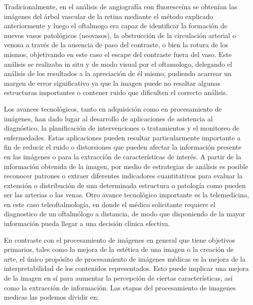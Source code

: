 Tradicionalmente, en el análisis de  angiografía con fluoresceína  se obtenían las imágenes del árbol vascular de la retina mediante  el método explicado anteriormente y luego  el oftalmogo era capaz de identificar la formación de nuevos vasos patológicos (neovasos), la obstrucción de la circulación arterial o venosa a través de la ausencia de paso del contraste, o bien la rotura de los mismos, objetivando en este caso el escape del contraste fuera del vaso. Este análisis se realizaba in situ y de modo visual por el oftamologo, delegando el análisis de los resultados a la apreciación de él mismo, pudiendo acarrear un margen de error significativo ya que la imagen puede no resaltar algunas estructuras importantes o contener ruido que dificulten el correcto análisis.

Los avances tecnológicos, tanto en adquisición como en procesamiento de imágenes, han dado lugar al desarrollo de aplicaciones de asistencia al diagnóstico, la planificación de intervenciones o tratamientos y el monitoreo de enfermedades. Estas aplicaciones pueden resultar particularmente importante a fin de reducir el ruido o distorsiones que pueden afectar la información presente en las imágenes o para la extracción de características de interés.
A partir de la información obtenida de la imagen, por medio de estrategias de análisis es posible reconocer patrones o extraer diferentes indicadores cuantitativos para evaluar la extensión o distribución de una determinada estructura o patología como pueden ser las arterias o las venas.
Otro avance tecnológico importante es la telemedicina, en este caso teleoftalmología, en donde el  médico solicitante requiere el diagnostico de un oftalmólogo a distancia, de modo que disponiendo de la mayor información pueda llegar a una decisión clínica efectiva.

En contraste con el procesamiento de imágenes en general que tiene objetivos primarios, tales como la mejora de la estética de una imagen o la creación de arte, el único propósito de procesamiento de imágenes médicas es la mejora de la interpretabilidad de los contenidos representados. Esto puede implicar una mejora de la imagen en sí para aumentar la percepción de ciertas características, así como la extracción de información.
Las etapas del procesamiento de imagenes medicas las podemos dividir en:

